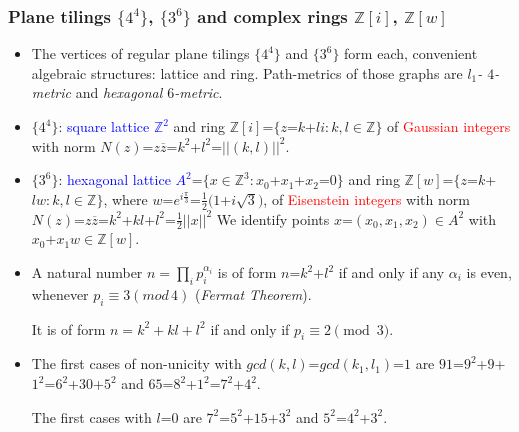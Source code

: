 \documentclass{beamer}
\begin{document}
\begin{frame}\frametitle{Plane tilings $\{4^4\}$, $\{3^6\}$ and 
 complex rings 
$\mathbb{Z}[i]$,
$\mathbb{Z}[w]$}
\vspace{-3mm}
\begin{itemize}
\item
The vertices of regular plane tilings $\{4^4\}$  and
$\{3^6\}$ form each,  convenient  algebraic structures: lattice and  ring.
Path-metrics of those graphs are {\em $l_1$- $4$-metric} and {\em 
hexagonal  
$6$-metric}.
\item $\{4^4\}$:
\textcolor{blue}{square lattice $\mathbb{Z}^2$} and  ring
$\mathbb{Z}[i]$=$\{z$=$k$+$li: k,l \in \mathbb{Z}\}$ of
\textcolor{red}{Gaussian integers} with norm
$N(z)$=$z\overline{z}$=$k^2$+$l^2$=$||(k,l)||^2$.
\item $\{3^6\}$:  \textcolor{blue}{hexagonal lattice $A^2$}=$\{x\in 
\mathbb{Z}^3:
x_0$+$x_1$+$x_2$=$0\}$  and  ring
$\mathbb{Z}[w]$=$\{z$=$k$+$lw: k,l \in \mathbb{Z}\}$, where
$w$=$e^{i\frac{\pi}{3}}$=$\frac{1}{2}(1$+$i\sqrt{3})$,  of
\textcolor{red}{Eisenstein integers}
with norm   
$N(z)$=$z\overline{z}$=$k^2$+$kl$+$l^2$=$\frac{1}{2}||x||^2$
We identify  points $x$=$(x_0,x_1,x_2)\in A^2$ with 
$x_0$+$x_1w\in \mathbb{Z}[w]$.
\pause

\item A natural number  $n= \prod_{i}p_i^{\alpha_i}$ is of form
$n$=$k^2$+$l^2$ if and only if any $\alpha_i$ is even,
whenever $p_i \equiv 3(mod\,4)$ ({\em Fermat Theorem}).

It is of form 
$n=k^2+kl+l^2$ if and only if 
$p_i\equiv 2\pmod 3$.

\item The first cases of non-unicity with 
$gcd(k,l)$=$gcd(k_1,l_1)$=$1$ are $91$=$9^2$+$9$+$1^2$=$6^2$+$30$+$5^2$  
and $65$=$8^2$+$1^2$=$7^2$+$4^2$. 

The first cases with $l$=$0$ are 
 $7^2$=$5^2$+$15$+$3^2$ and $5^2$=$4^2$+$3^2$.
\end{itemize}
\end{frame}
\end{document}
